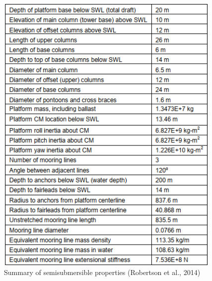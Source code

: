 \documentclass[a4paper, 11pt]{article}
\begin{document}
\begin{figure}[H]
\begin{minipage}{0.47\textwidth}
        \label{fig:OC4}
    \end{minipage}
    \hfill
    \begin{minipage}{0.5\textwidth}
        \centering
        \includegraphics[width=0.97\textwidth]{characteristics.png}
        \caption{\small Summary of semisubmersible properties (Robertson et al., 2014)}
        \label{fig:characteristics}
    \end{minipage}
\end{figure}
\end{document}
